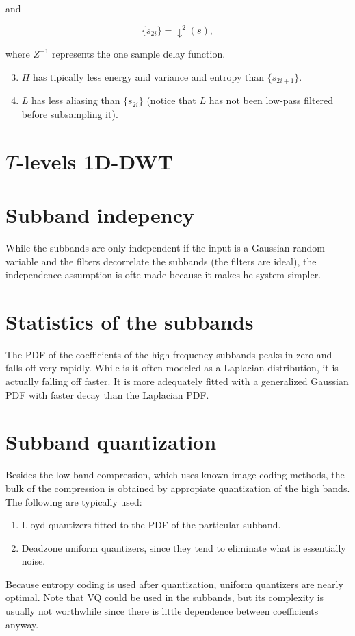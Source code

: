and

\begin{equation*}
   \{s_{2i}\} = \downarrow^2(s),
\end{equation*}

where \(Z^{-1}\) represents the one sample delay function.

\begin{enumerate}
\setcounter{enumi}{2}
\tightlist
\item
  \(H\) has tipically less energy and variance and entropy than
  \(\{s_{2i+1}\}\).
\item
  \(L\) has less aliasing than \(\{s_{2i}\}\) (notice that \(L\) has not
  been low-pass filtered before subsampling it).
\end{enumerate}

\section{$T$-levels 1D-DWT}

\section{Subband indepency~\cite{vetterli1995wavelets}}
While the subbands are only independent if the input is a Gaussian
random variable and the filters decorrelate the subbands (the filters
are ideal), the independence assumption is ofte made because it makes
he system simpler.

\section{Statistics of the subbands~\cite{vetterli1995wavelets}}
The PDF of the coefficients of the high-frequency subbands peaks in
zero and falls off very rapidly. While is it often modeled as a
Laplacian distribution, it is actually falling off faster. It is more
adequately fitted with a generalized Gaussian PDF with faster decay
than the Laplacian PDF.

\section{Subband quantization~\cite{vetterli1995wavelets}}
Besides the low band compression, which uses known image coding
methods, the bulk of the compression is obtained by appropiate
quantization of the high bands. The
following  are typically used:
\begin{enumerate}
\item Lloyd quantizers fitted to the PDF of the particular subband.
\item Deadzone uniform quantizers, since they tend to eliminate what
  is essentially noise.
\end{enumerate}
Because entropy coding is used after quantization, uniform quantizers
are nearly optimal. Note that VQ could be used in the subbands, but
its complexity is usually not worthwhile since there is little
dependence between coefficients anyway.

